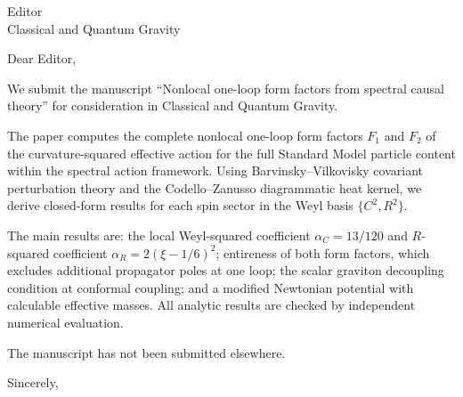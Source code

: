 \documentclass[12pt]{letter}
\date{}
\begin{document}
\begin{letter}{Editor\\Classical and Quantum Gravity}

\opening{Dear Editor,}

We submit the manuscript ``Nonlocal one-loop form factors from spectral causal theory'' for consideration in Classical and Quantum Gravity.

The paper computes the complete nonlocal one-loop form factors $F_1$ and $F_2$ of the curvature-squared effective action for the full Standard Model particle content within the spectral action framework. Using Barvinsky--Vilkovisky covariant perturbation theory and the Codello--Zanusso diagrammatic heat kernel, we derive closed-form results for each spin sector in the Weyl basis $\{C^2, R^2\}$.

The main results are: the local Weyl-squared coefficient $\alpha_C = 13/120$ and $R$-squared coefficient $\alpha_R = 2(\xi - 1/6)^2$; entireness of both form factors, which excludes additional propagator poles at one loop; the scalar graviton decoupling condition at conformal coupling; and a modified Newtonian potential with calculable effective masses. All analytic results are checked by independent numerical evaluation.

The manuscript has not been submitted elsewhere.

\closing{Sincerely,}

\end{letter}
\end{document}
